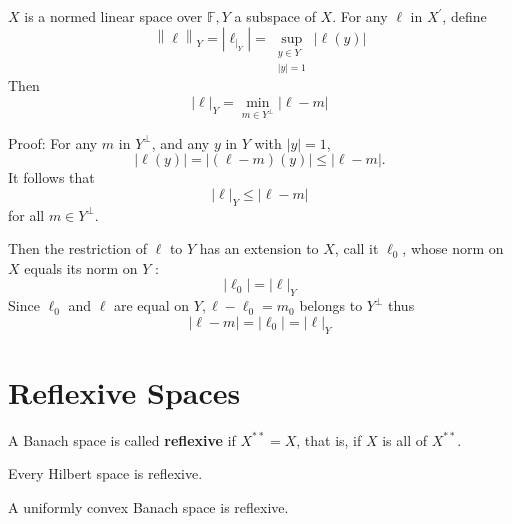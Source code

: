 \documentclass[12pt, oneside]{book}
\begin{document}
\begin{theorem}
    $X$ is a normed linear space over $\mathbb{F}, Y$ a subspace of $X$. For any $\ell$ in $X^{\prime}$, define
    \begin{equation*}
        \left\|\ell\right\|_Y
        =
        |\ell_{\mid_Y}|
        =
        \sup _{\substack{y \in Y \\|y|=1}}\left|\ell(y)\right|
    \end{equation*}
    Then
    \begin{equation*}
        |\ell|_Y=\min _{m \in Y^{\perp}}|\ell-m|
    \end{equation*}

    Proof:
    For any $m$ in $Y^{\perp}$, and any $y$ in $Y$ with $|y|=1$,
    \begin{equation*}
        |\ell(y)|=|(\ell-m)(y)| \leq|\ell-m| .
    \end{equation*}
    It follows that
    \begin{equation*}
        |\ell|_Y \leq \left|\ell -m\right|
    \end{equation*}
    for all $m\in Y^\bot$.


    Then the restriction of $\ell$ to $Y$ has an extension to $X$, call it $\ell_0$, whose norm on $X$ equals its norm on $Y$ :
    \begin{equation*}
        \left|\ell_0\right|=|\ell|_Y
    \end{equation*}
    Since $\ell_0$ and $\ell$ are equal on $Y, \ell-\ell_0=m_0$ belongs to $Y^{\perp}$ thus
    \begin{equation*}
        |\ell-m|=\left|\ell_0\right|=|\ell|_Y
    \end{equation*}
\end{theorem}


\section{Reflexive Spaces}
\begin{definition}
    A Banach space is called \textbf{reflexive} if $X^{**}=X$, that is, if $X$ is all of $X^{**}$.
\end{definition}
\begin{theorem}
    Every Hilbert space is reflexive.
\end{theorem}
\begin{theorem}[Milman]
    A uniformly convex Banach space is reflexive.
\end{theorem}
\end{document}
